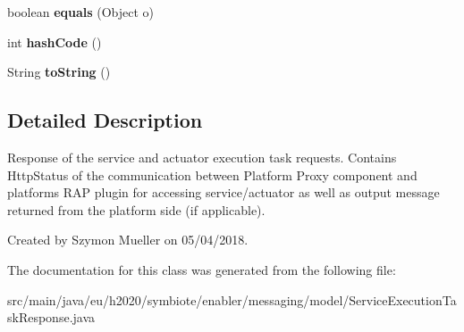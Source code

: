 \begin{DoxyCompactItemize}
boolean {\bfseries equals} (Object o)
\item 
\mbox{\label{classeu_1_1h2020_1_1symbiote_1_1enabler_1_1messaging_1_1model_1_1ServiceExecutionTaskResponse_aa6a0a4c9f71a9e0e8c0db50f3bb7acdd}} 
int {\bfseries hash\+Code} ()
\item 
\mbox{\label{classeu_1_1h2020_1_1symbiote_1_1enabler_1_1messaging_1_1model_1_1ServiceExecutionTaskResponse_ada907f2fd432e323f3b6a2f83ce0da8f}} 
String {\bfseries to\+String} ()
\end{DoxyCompactItemize}


\subsection{Detailed Description}
Response of the service and actuator execution task requests. Contains Http\+Status of the communication between Platform Proxy component and platform\textquotesingle{}s R\+AP plugin for accessing service/actuator as well as output message returned from the platform side (if applicable).

Created by Szymon Mueller on 05/04/2018. 

The documentation for this class was generated from the following file\+:\begin{DoxyCompactItemize}
\item 
src/main/java/eu/h2020/symbiote/enabler/messaging/model/Service\+Execution\+Task\+Response.\+java\end{DoxyCompactItemize}
